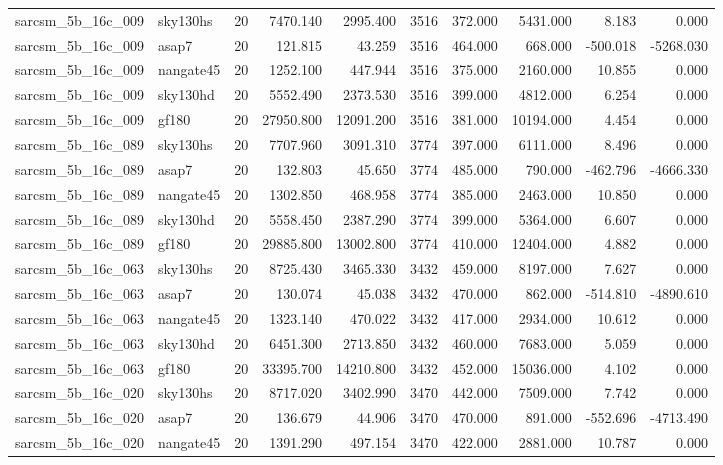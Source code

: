 \begin{longtable}{llrrrrrrrr}
sarcsm\_5b\_16c\_009 & sky130hs & 20 & 7470.140 & 2995.400 & 3516 & 372.000 & 5431.000 & 8.183 & 0.000 \\
sarcsm\_5b\_16c\_009 & asap7 & 20 & 121.815 & 43.259 & 3516 & 464.000 & 668.000 & -500.018 & -5268.030 \\
sarcsm\_5b\_16c\_009 & nangate45 & 20 & 1252.100 & 447.944 & 3516 & 375.000 & 2160.000 & 10.855 & 0.000 \\
sarcsm\_5b\_16c\_009 & sky130hd & 20 & 5552.490 & 2373.530 & 3516 & 399.000 & 4812.000 & 6.254 & 0.000 \\
sarcsm\_5b\_16c\_009 & gf180 & 20 & 27950.800 & 12091.200 & 3516 & 381.000 & 10194.000 & 4.454 & 0.000 \\
sarcsm\_5b\_16c\_089 & sky130hs & 20 & 7707.960 & 3091.310 & 3774 & 397.000 & 6111.000 & 8.496 & 0.000 \\
sarcsm\_5b\_16c\_089 & asap7 & 20 & 132.803 & 45.650 & 3774 & 485.000 & 790.000 & -462.796 & -4666.330 \\
sarcsm\_5b\_16c\_089 & nangate45 & 20 & 1302.850 & 468.958 & 3774 & 385.000 & 2463.000 & 10.850 & 0.000 \\
sarcsm\_5b\_16c\_089 & sky130hd & 20 & 5558.450 & 2387.290 & 3774 & 399.000 & 5364.000 & 6.607 & 0.000 \\
sarcsm\_5b\_16c\_089 & gf180 & 20 & 29885.800 & 13002.800 & 3774 & 410.000 & 12404.000 & 4.882 & 0.000 \\
sarcsm\_5b\_16c\_063 & sky130hs & 20 & 8725.430 & 3465.330 & 3432 & 459.000 & 8197.000 & 7.627 & 0.000 \\
sarcsm\_5b\_16c\_063 & asap7 & 20 & 130.074 & 45.038 & 3432 & 470.000 & 862.000 & -514.810 & -4890.610 \\
sarcsm\_5b\_16c\_063 & nangate45 & 20 & 1323.140 & 470.022 & 3432 & 417.000 & 2934.000 & 10.612 & 0.000 \\
sarcsm\_5b\_16c\_063 & sky130hd & 20 & 6451.300 & 2713.850 & 3432 & 460.000 & 7683.000 & 5.059 & 0.000 \\
sarcsm\_5b\_16c\_063 & gf180 & 20 & 33395.700 & 14210.800 & 3432 & 452.000 & 15036.000 & 4.102 & 0.000 \\
sarcsm\_5b\_16c\_020 & sky130hs & 20 & 8717.020 & 3402.990 & 3470 & 442.000 & 7509.000 & 7.742 & 0.000 \\
sarcsm\_5b\_16c\_020 & asap7 & 20 & 136.679 & 44.906 & 3470 & 470.000 & 891.000 & -552.696 & -4713.490 \\
sarcsm\_5b\_16c\_020 & nangate45 & 20 & 1391.290 & 497.154 & 3470 & 422.000 & 2881.000 & 10.787 & 0.000 \\

\end{longtable}

